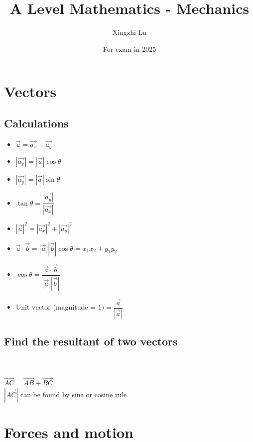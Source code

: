 \documentclass[A4paper, 11pt]{article}
\title{A Level Mathematics - Mechanics}
\author{Xingzhi Lu}
\date{For exam in 2025}
\begin{document}
	\maketitle

	\section{Vectors}
	\subsection{Calculations}
	\begin{itemize}
		\item $\vec{a}=\vec{a_x}+\vec{a_y}$
		\item $|\vec{a_x}|=|\vec{a}|\cos\theta$
		\item $|\vec{a_y}|=|\vec{a}|\sin\theta$
		\item $\tan\theta = \dfrac{|\vec{a_y}|}{|\vec{a_x}|}$
		\item $|\vec{a}|^2=|\vec{a_x}|^2+|\vec{a_y}|^2$
		\item $\vec{a} \cdot \vec{b} = |\vec{a}||\vec{b}|\cos\theta = x_1x_2+y_1y_2$
		\item $\cos \theta = \dfrac{\vec{a} \cdot \vec{b}}{|\vec{a}||\vec{b}|}$
		\item $\text{Unit vector (magnitude = 1)} = \dfrac{\vec{a}}{|\vec{a}|}$

	\end{itemize}
	\subsection{Find the resultant of two vectors}
	\\
	\\
	$\overrightarrow{AC}=\overrightarrow{AB}+\overrightarrow{BC}$\\
	$|\overrightarrow{AC}|$ can be found by sine or cosine rule

	\section{Forces and motion}
	
\end{document}
